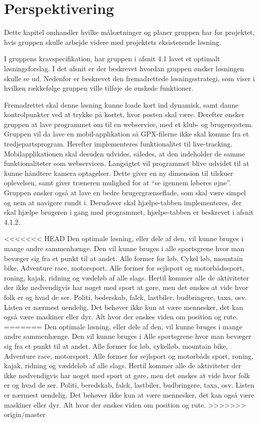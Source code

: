 \chapter{Perspektivering}
Dette kapitel omhandler hvilke målsætninger og planer gruppen har for projektet, hvis gruppen skulle arbejde videre med projektets eksisterende løsning.

I gruppens kravspecifikation, har gruppen i afsnit 4.1 lavet et optimalt løsningsforslag. I det afsnit er der beskrevet hvordan gruppen ønsker løsningen skulle se ud. Nedenfor er beskrevet den fremadrettede løsningsstrategi, som viser i hvilken rækkefølge gruppen ville tilføje de ønskede funktioner.

Fremadrettet skal denne løsning kunne loade kort ind dynamisk, samt danne kontrolpunkter ved at trykke på kortet, hvor posten skal være. Derefter ønsker gruppen at lave programmet om til en webservice, med et klub- og brugersystem. \newline
Gruppen vil da lave en mobil-applikation så GPX-filerne ikke skal komme fra et tredjepartsprogram. Herefter implementeres funktionalitet til live-tracking.  Mobilapplikationen skal desuden udvides, således, at den indeholder de samme funktionaliteter som webservicen. Langsigtet vil programmet blive udvidet til at kunne håndtere kamera optagelser. Dette giver en ny dimension til tilskuer oplevelsen, samt giver træneren mulighed for at “se igennem løberes øjne”. \newline
Gruppen ønsker også at lave en bedre brugergrænseflade, som skal være simpel og nem at navigere rundt i. Derudover skal hjælpe-tabben implementeres, der skal hjælpe brugeren i gang med programmet, hjælpe-tabben er beskrevet i afsnit 4.1.2. 

<<<<<<< HEAD
Den optimale løsning, eller dele af den, vil kunne bruges i mange andre sammenhænge. Den vil kunne bruges i alle sportsgrene hvor man bevæger sig fra et punkt til at andet. Alle former for løb, Cykel løb, mountain bike, Adventure race, motorsport. Alle former for sejlsport og motorbådssport, roning, kajak, ridning og vædeløb af alle slags. Hertil kommer alle de aktiviteter der ikke nødvendigvis har noget med sport at gøre, men det ønskes at vide hvor folk er og hvad de ser. Politi, bederskab, falck, lastbiler, budbringere, taxa, osv. Listen er nærmest uendelig. Det behøver ikke kun at være mennesker, det kan også være maskiner eller dyr. Alt hvor der ønskes viden om position og rute.
=======
Den optimale løsning, eller dele af den, vil kunne bruges i mange andre sammenhænge. Den vil kunne bruges i Alle sportsgrene hvor man bevæger sig fra et punkt til at andet. Alle former for løb, cykelløb, mountain bike, Adventure race, motorsport. Alle former for sejlsport og motorbåds sport, roning, kajak, ridning og væddeløb af alle slags. Hertil kommer alle de aktiviteter der ikke nødvendigvis har noget med sport at gøre, men det ønskes at vide hvor folk er og hvad de ser. Politi, beredskab, falck, lastbiler, budbringere, taxa, osv. Listen er nærmest uendelig. Det behøver ikke kun at være mennesker, det kan også være maskiner eller dyr. Alt hvor der ønskes viden om position og rute.
>>>>>>> origin/master
